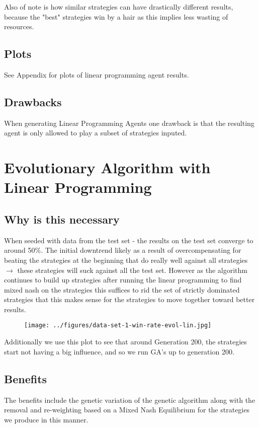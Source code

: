 \documentclass[12pt,letter]{article}
\begin{document}
Also of note is how similar strategies can have drastically different results, because the "best" strategies win by a hair as this implies less wasting of resources.

\subsection{Plots}
See Appendix for plots of linear programming agent results.

\subsection{Drawbacks}
When generating Linear Programming Agents one drawback is that the resulting agent is only allowed to play a subset of strategies inputed.

\section{Evolutionary Algorithm with Linear Programming} %
\subsection{Why is this necessary}
When seeded with data from the test set - the results on the test set converge to around 50\%. The initial downtrend likely as a result of overcompensating for beating the strategies at the beginning that do really well against all strategies $\to$ these strategies will suck against all the test set. However as the algorithm continues to build up strategies after running the linear programming to find mixed nash on the strategies this suffices to rid the set of strictly dominated strategies that this makes sense for the strategies to move together toward better results.

\begin{figure}[h]
\texttt{[image: ../figures/data-set-1-win-rate-evol-lin.jpg]}
\centering
\end{figure}

Additionally we use this plot to see that around Generation 200, the strategies start not having a big influence, and so we run GA's up to generation 200.

\subsection{Benefits}
The benefits include the genetic variation of the genetic algorithm along with the removal and re-weighting based on a Mixed Nash Equilibrium for the strategies we produce in this manner.
\end{document}
